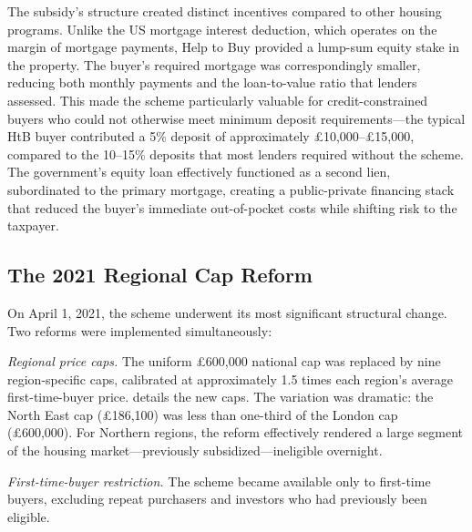 \documentclass[12pt]{article}
\begin{document}
The subsidy's structure created distinct incentives compared to other housing programs. Unlike the US mortgage interest deduction, which operates on the margin of mortgage payments, Help to Buy provided a lump-sum equity stake in the property. The buyer's required mortgage was correspondingly smaller, reducing both monthly payments and the loan-to-value ratio that lenders assessed. This made the scheme particularly valuable for credit-constrained buyers who could not otherwise meet minimum deposit requirements---the typical HtB buyer contributed a 5\% deposit of approximately \pounds10,000--\pounds15,000, compared to the 10--15\% deposits that most lenders required without the scheme. The government's equity loan effectively functioned as a second lien, subordinated to the primary mortgage, creating a public-private financing stack that reduced the buyer's immediate out-of-pocket costs while shifting risk to the taxpayer.

\subsection{The 2021 Regional Cap Reform}

On April 1, 2021, the scheme underwent its most significant structural change. Two reforms were implemented simultaneously:

\textit{Regional price caps.} The uniform \pounds600,000 national cap was replaced by nine region-specific caps, calibrated at approximately 1.5 times each region's average first-time-buyer price.  details the new caps. The variation was dramatic: the North East cap (\pounds186,100) was less than one-third of the London cap (\pounds600,000). For Northern regions, the reform effectively rendered a large segment of the housing market---previously subsidized---ineligible overnight.

\textit{First-time-buyer restriction.} The scheme became available only to first-time buyers, excluding repeat purchasers and investors who had previously been eligible.
\end{document}
